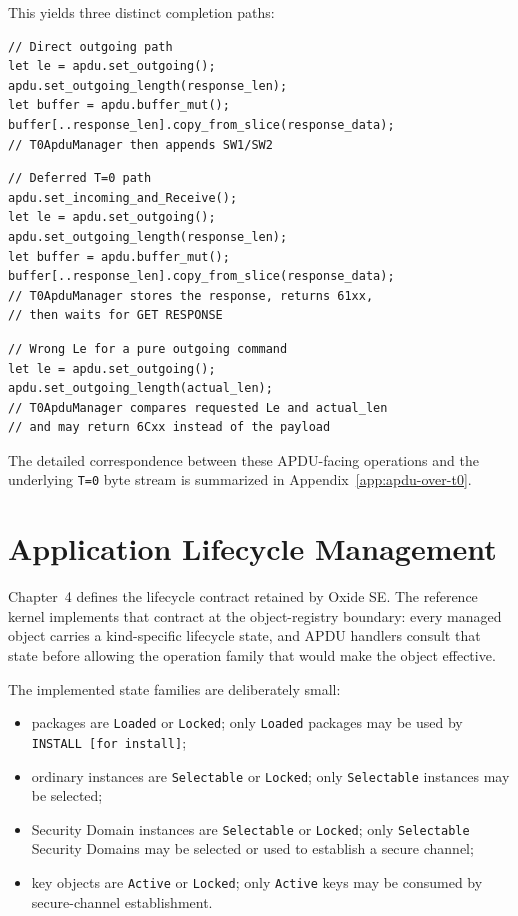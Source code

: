 This yields three distinct completion paths:

\begin{verbatim}
// Direct outgoing path
let le = apdu.set_outgoing();
apdu.set_outgoing_length(response_len);
let buffer = apdu.buffer_mut();
buffer[..response_len].copy_from_slice(response_data);
// T0ApduManager then appends SW1/SW2
\end{verbatim}

\begin{verbatim}
// Deferred T=0 path
apdu.set_incoming_and_Receive();
let le = apdu.set_outgoing();
apdu.set_outgoing_length(response_len);
let buffer = apdu.buffer_mut();
buffer[..response_len].copy_from_slice(response_data);
// T0ApduManager stores the response, returns 61xx,
// then waits for GET RESPONSE
\end{verbatim}

\begin{verbatim}
// Wrong Le for a pure outgoing command
let le = apdu.set_outgoing();
apdu.set_outgoing_length(actual_len);
// T0ApduManager compares requested Le and actual_len
// and may return 6Cxx instead of the payload
\end{verbatim}

The detailed correspondence between these APDU-facing operations and the
underlying \texttt{T=0} byte stream is summarized in
Appendix~\ref{app:apdu-over-t0}.

\section{Application Lifecycle Management}
\label{sec:impl-lifecycle}

Chapter~4 defines the lifecycle contract retained by Oxide SE. The reference
kernel implements that contract at the object-registry boundary: every managed
object carries a kind-specific lifecycle state, and APDU handlers consult that
state before allowing the operation family that would make the object effective.

The implemented state families are deliberately small:
\begin{itemize}
\item packages are \texttt{Loaded} or \texttt{Locked}; only
      \texttt{Loaded} packages may be used by \texttt{INSTALL [for install]};
\item ordinary instances are \texttt{Selectable} or \texttt{Locked}; only
      \texttt{Selectable} instances may be selected;
\item Security Domain instances are \texttt{Selectable} or \texttt{Locked};
      only \texttt{Selectable} Security Domains may be selected or used to
      establish a secure channel;
\item key objects are \texttt{Active} or \texttt{Locked}; only
      \texttt{Active} keys may be consumed by secure-channel establishment.
\end{itemize}

